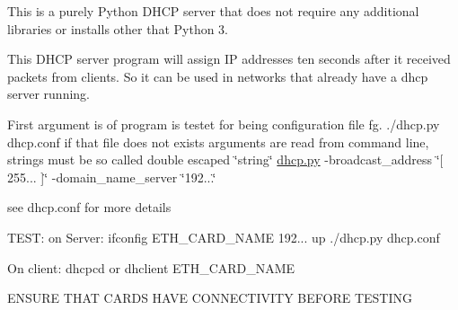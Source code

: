 This is a purely Python DHCP server that does not require any additional libraries or installs other that Python 3.

This DHCP server program will assign IP addresses ten seconds after it received packets from clients. So it can be used in networks that already have a dhcp server running.

First argument is of program is testet for being configuration file fg. ./dhcp.py dhcp.\+conf if that file does not exists arguments are read from command line, strings must be so called double escaped \char`\"{}\textquotesingle{}string\textquotesingle{}\char`\"{} \mbox{\hyperlink{dhcp_8py}{dhcp.\+py}} -\/broadcast\+\_\+address \char`\"{}\mbox{[} \textquotesingle{}255...\textquotesingle{} \mbox{]}\char`\"{} -\/domain\+\_\+name\+\_\+server \char`\"{}\textquotesingle{}192...\textquotesingle{}\char`\"{}

see dhcp.\+conf for more details

TEST\+: on Server\+: ifconfig ETH\+\_\+\+CARD\+\_\+\+NAME 192... up ./dhcp.py dhcp.\+conf

On client\+: dhcpcd or dhclient ETH\+\_\+\+CARD\+\_\+\+NAME

ENSURE THAT CARDS HAVE CONNECTIVITY BEFORE TESTING 